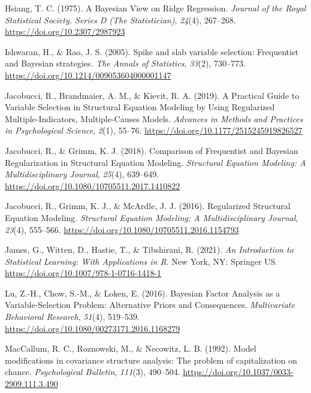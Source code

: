 \documentclass[
  man, donotrepeattitle,floatsintext]{apa6}
\newlength{\cslhangindent}
\newlength{\cslentryspacingunit} %
\newenvironment{CSLReferences}[2] %
 {%
  \setlength{\parindent}{0pt}
  \ifodd #1
  \let\oldpar\par
  \def\par{\hangindent=\cslhangindent\oldpar}
  \fi
  \setlength{\parskip}{#2\cslentryspacingunit}
 }%
 {}
\begin{document}
\begin{CSLReferences}{1}{0}
\leavevmode{}%
Hsiang, T. C. (1975). A {Bayesian} {View} on {Ridge} {Regression}. \emph{Journal of the Royal Statistical Society. Series D (The Statistician)}, \emph{24}(4), 267--268. \url{https://doi.org/10.2307/2987923}

\leavevmode{}%
Ishwaran, H., \& Rao, J. S. (2005). Spike and slab variable selection: {Frequentist} and {Bayesian} strategies. \emph{The Annals of Statistics}, \emph{33}(2), 730--773. \url{https://doi.org/10.1214/009053604000001147}

\leavevmode{}%
Jacobucci, R., Brandmaier, A. M., \& Kievit, R. A. (2019). A {Practical} {Guide} to {Variable} {Selection} in {Structural} {Equation} {Modeling} by {Using} {Regularized} {Multiple}-{Indicators}, {Multiple}-{Causes} {Models}. \emph{Advances in Methods and Practices in Psychological Science}, \emph{2}(1), 55--76. \url{https://doi.org/10.1177/2515245919826527}

\leavevmode{}%
Jacobucci, R., \& Grimm, K. J. (2018). Comparison of {Frequentist} and {Bayesian} {Regularization} in {Structural} {Equation} {Modeling}. \emph{Structural Equation Modeling: A Multidisciplinary Journal}, \emph{25}(4), 639--649. \url{https://doi.org/10.1080/10705511.2017.1410822}

\leavevmode{}%
Jacobucci, R., Grimm, K. J., \& McArdle, J. J. (2016). Regularized {Structural} {Equation} {Modeling}. \emph{Structural Equation Modeling: A Multidisciplinary Journal}, \emph{23}(4), 555--566. \url{https://doi.org/10.1080/10705511.2016.1154793}

\leavevmode{}%
James, G., Witten, D., Hastie, T., \& Tibshirani, R. (2021). \emph{An {Introduction} to {Statistical} {Learning}: With {Applications} in {R}}. New York, NY: Springer US. \url{https://doi.org/10.1007/978-1-0716-1418-1}

\leavevmode{}%
Lu, Z.-H., Chow, S.-M., \& Loken, E. (2016). Bayesian {Factor} {Analysis} as a {Variable}-{Selection} {Problem}: {Alternative} {Priors} and {Consequences}. \emph{Multivariate Behavioral Research}, \emph{51}(4), 519--539. \url{https://doi.org/10.1080/00273171.2016.1168279}

\leavevmode{}%
MacCallum, R. C., Roznowski, M., \& Necowitz, L. B. (1992). Model modifications in covariance structure analysis: The problem of capitalization on chance. \emph{Psychological Bulletin}, \emph{111}(3), 490--504. \url{https://doi.org/10.1037/0033-2909.111.3.490}


\end{CSLReferences}
\end{document}
